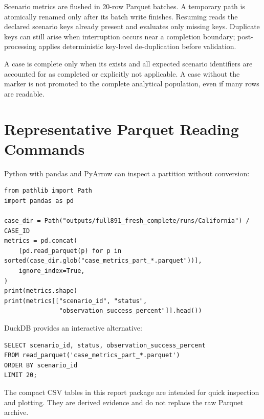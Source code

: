 Scenario metrics are flushed in 20-row Parquet batches. A temporary path is atomically renamed only after its batch write finishes. Resuming reads the declared scenario keys already present and evaluates only missing keys. Duplicate keys can still arise when interruption occurs near a completion boundary; post-processing applies deterministic key-level de-duplication before validation.

A case is complete only when its  exists and all expected scenario identifiers are accounted for as completed or explicitly not applicable. A case without the marker is not promoted to the complete analytical population, even if many rows are readable.

\section{Representative Parquet Reading Commands}

Python with pandas and PyArrow can inspect a partition without conversion:

\begin{lstlisting}
from pathlib import Path
import pandas as pd

case_dir = Path("outputs/full891_fresh_complete/runs/California") / CASE_ID
metrics = pd.concat(
    [pd.read_parquet(p) for p in sorted(case_dir.glob("case_metrics_part_*.parquet"))],
    ignore_index=True,
)
print(metrics.shape)
print(metrics[["scenario_id", "status",
               "observation_success_percent"]].head())
\end{lstlisting}

DuckDB provides an interactive alternative:

\begin{lstlisting}
SELECT scenario_id, status, observation_success_percent
FROM read_parquet('case_metrics_part_*.parquet')
ORDER BY scenario_id
LIMIT 20;
\end{lstlisting}

The compact CSV tables in this report package are intended for quick inspection and plotting. They are derived evidence and do not replace the raw Parquet archive.
